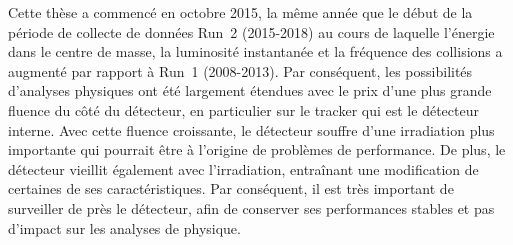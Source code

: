 




Cette thèse a commencé en octobre 2015, la même année que le début de la période de collecte de données Run~2 (2015-2018) au cours de laquelle l’énergie dans le centre de masse, la luminosité instantanée et la fréquence des collisions a augmenté par rapport à Run~1 (2008-2013). Par conséquent, les possibilités d'analyses physiques ont été largement étendues avec le prix d'une plus grande fluence du côté du détecteur, en particulier sur le tracker qui est le détecteur interne. Avec cette fluence croissante, le détecteur souffre d’une irradiation plus importante qui pourrait être à l’origine de problèmes de performance. De plus, le détecteur vieillit également avec l'irradiation, entraînant une modification de certaines de ses caractéristiques. Par conséquent, il est très important de surveiller de près le détecteur, afin de conserver ses performances stables et pas d'impact sur les analyses de physique.

